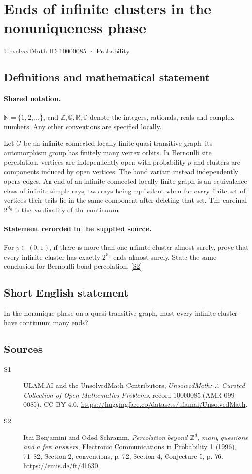 \documentclass[11pt]{article}
\newcommand{\sref}[2]{\hyperlink{source:#1:#2}{[S#2]}}
\begin{document}
\setcounter{section}{10000084}
\section{Ends of infinite clusters in the nonuniqueness phase}\label{10000085}
{\small\sffamily UnsolvedMath ID 10000085 · Probability}
\subsection{Definitions and mathematical statement}

\paragraph{Shared notation.}$\mathbb N=\{1,2,\ldots\}$, and $\mathbb Z,\mathbb Q,\mathbb R,\mathbb C$ denote the integers, rationals, reals and complex numbers. Any other conventions are specified locally.


Let $G$ be an infinite connected locally finite quasi-transitive graph: its automorphism group has finitely many vertex orbits. In Bernoulli site percolation, vertices are independently open with probability $p$ and clusters are components induced by open vertices. The bond variant instead independently opens edges. An end of an infinite connected locally finite graph is an equivalence class of infinite simple rays, two rays being equivalent when for every finite set of vertices their tails lie in the same component after deleting that set. The cardinal $2^{\aleph_0}$ is the cardinality of the continuum.
\paragraph{Statement recorded in the supplied source.}
For $p\in(0,1)$, if there is more than one infinite cluster almost surely, prove that every infinite cluster has exactly $2^{\aleph_0}$ ends almost surely. State the same conclusion for Bernoulli bond percolation. \sref{10000085}{2}
\subsection{Short English statement}
In the nonunique phase on a quasi-transitive graph, must every infinite cluster have continuum many ends?
\subsection{Sources}
\begin{description}
\item[\hypertarget{source:10000085:1}{S1}] ULAM.AI and the UnsolvedMath Contributors, \emph{UnsolvedMath: A Curated Collection of Open Mathematics Problems}, record 10000085 (AMR-099-0085). CC BY 4.0. \url{https://huggingface.co/datasets/ulamai/UnsolvedMath}.
\item[\hypertarget{source:10000085:2}{S2}] Itai Benjamini and Oded Schramm, \emph{Percolation beyond $\mathbb Z^d$, many questions and a few answers}, Electronic Communications in Probability 1 (1996), 71--82, Section 2, conventions, p. 72; Section 4, Conjecture 5, p. 76. \url{https://emis.de/ft/41630}.
\end{description}
\label{end:10000085}
\end{document}
